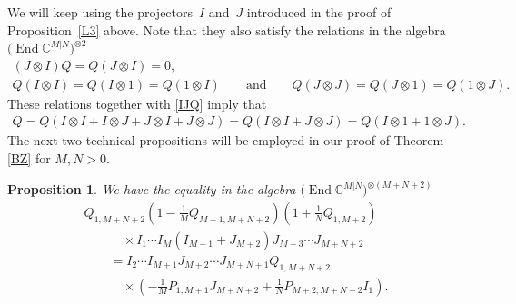 \documentclass[pdftex]{sigma}
\numberwithin{equation}{section}
\newtheorem{Proposition}[Theorem]{Proposition}
\def\CC{{\mathbb{C}}}
\def\CMN{\CC^{M|N}}
\def\End{\operatorname{End}}
\def\ot{\otimes}
\begin{document}
We will keep using the projectors~$I$ and~$J$ introduced in
the proof of Proposition~\ref{L3} above.
Note that they also satisfy the relations in the algebra $\big(\End\CMN\big)^{\ot2}$
\begin{gather*}
(J\ot I) Q=Q (J\ot I)=0 ,\\
Q (I\ot I)=Q (I\ot 1)=Q (1\ot I) \qquad\text{and}\qquad Q (J\ot J)=Q (J\ot 1)=Q (1\ot J) .
\end{gather*}
These relations together with \eqref{IJQ} imply that
\begin{gather}
Q=Q (I\ot I+I\ot J+J\ot I+J\ot J)=Q (I\ot I+J\ot J) =Q (I\ot 1+1\ot J) .\label{IJ}
\end{gather}
The next two technical propositions
will be employed in our proof of Theorem \ref{BZ} for $M,N>0 $.

\begin{Proposition}\label{L2}
We have the equality in the algebra $\big(\End\CMN\big)^{\ot (M+N+2)}$
\begin{gather*}
 Q_{1,M+N+2}
\left( 1-\frac1M Q_{M+1,M+N+2} \right)
\left( 1+\frac1N Q_{1,M+2} \right)\\
\qquad\quad{} \times
I_{1} \cdots I_{M} ( I_{M+1}+J_{M+2} )
J_{M+3} \cdots J_{M+N+2} \\
\qquad {} = I_{2} \cdots I_{M+1}
J_{M+2} \cdots J_{M+N+1} Q_{1,M+N+2}\\
\qquad\quad{}\times
\left(- \frac1M P_{1,M+1} J_{M+N+2}+
\frac1N P_{M+2,M+N+2} I_{1} \right) .
\end{gather*}
\end{Proposition}
\end{document}

